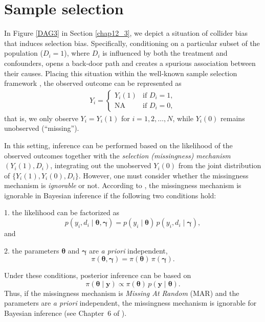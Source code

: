 \section{Sample selection}\label{sec12_8}

In Figure \ref{DAG3} in Section \ref{chap12_3}, we depict a situation of collider bias that induces selection bias. Specifically, conditioning on a particular subset of the population ($D_i=1$), where $D_i$ is influenced by both the treatment and confounders, opens a back-door path and creates a spurious association between their causes. Placing this situation within the well-known sample selection framework \cite{heckman1979sample}, the observed outcome can be represented as
\begin{align*}
	Y_i = \begin{cases}
		Y_i(1) & \text{if } D_i=1, \\
		\text{NA} & \text{if } D_i=0,
	\end{cases}
\end{align*}
that is, we only observe $Y_i = Y_i(1)$ for $i=1,2,\dots,N$, while $Y_i(0)$ remains unobserved (``missing'').

In this setting, inference can be performed based on the likelihood of the observed outcomes together with the \textit{selection (missingness) mechanism} $(Y_i(1),D_i)$, integrating out the unobserved $Y_i(0)$ from the joint distribution of $\{Y_i(1),Y_i(0),D_i\}$. However, one must consider whether the missingness mechanism is \textit{ignorable} or not. According to \cite{little2019statistical}, the missingness mechanism is ignorable in Bayesian inference if the following two conditions hold:
  
1. the likelihood can be factorized as
\[
p(y_i, d_i\mid \boldsymbol{\theta},\boldsymbol{\gamma}) 
= p(y_i\mid \boldsymbol{\theta})\, p(y_i,d_i \mid \boldsymbol{\gamma}),
\] 
and 
 
2. the parameters $\boldsymbol{\theta}$ and $\boldsymbol{\gamma}$ are \emph{a priori} independent,
\[
\pi(\boldsymbol{\theta},\boldsymbol{\gamma}) 
= \pi(\boldsymbol{\theta})\,\pi(\boldsymbol{\gamma}).
\]

Under these conditions, posterior inference can be based on
\[
\pi(\boldsymbol{\theta}\mid \mathbf{y}) 
\propto \pi(\boldsymbol{\theta})\, p(\mathbf{y} \mid \boldsymbol{\theta}).
\]
Thus, if the missingness mechanism is \textit{Missing At Random} (MAR) and the parameters are \emph{a priori} independent, the missingness mechanism is ignorable for Bayesian inference (see Chapter~6 of \cite{little2019statistical}).

